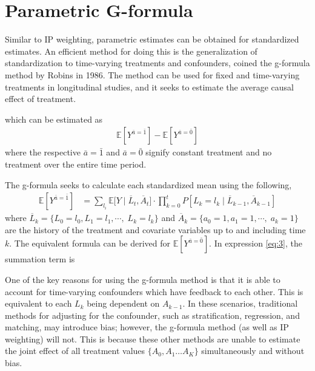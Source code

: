 \section{Parametric G-formula} 
Similar to IP weighting, parametric estimates can be obtained for standardized estimates.  An efficient method for doing this is the generalization of standardization to time-varying treatments and confounders, coined the g-formula method by Robins in 1986.\cite{robins1986new, wright2015international, hernan_robins_2016}  The method can be used for fixed and time-varying treatments in longitudinal studies, and it seeks to estimate the average causal effect of treatment.  

which can be estimated as 
\begin{align} 
\mathbb{E}[Y^{\bar{a} = \bar{1}}] - \mathbb{E}[Y^{\bar{a} = \bar{0}}] 
\end{align} 
where the respective $\bar{a} = \bar{1}$ and $\bar{a} = \bar{0}$ signify constant treatment and no treatment over the entire time period.  

The g-formula seeks to calculate each standardized mean using the following, 
\begin{align} \label{eq:3} 
\mathbb{E}[Y^{\bar{a}= \bar{1}}] &= \sum_{l_i} \mathbb{E} \big[Y \mid  \overline{L}_{t}, \overline{A}_{t} \big]\cdot \prod_{k=0}^t P[L_k = l_k \mid \overline{L}_{k-1}, \overline{A}_{k-1}]
\end{align}
where $\overline{L}_k = \{L_{0} = l_0, L_{1} = l_1,  \cdots, \; L_{k} = l_k\}$ and $\overline{A}_k = \{a_{0} = 1, a_{1} = 1,  \cdots, \; a_{k} = 1\}$ are the history of the treatment and covariate variables up to and including time $k$.  The equivalent formula can be derived for $ \mathbb{E}[Y^{\bar{a} = \bar{0}}]$.   In expression \ref{eq:3}, the summation term is %

One of the key reasons for using the g-formula method is that it is able to account for time-varying confounders which have feedback to each other.  This is equivalent to each $L_k$ being dependent on $A_{k-1}$.\cite{robins1986new}  In these scenarios, traditional methods for adjusting for the confounder, such as stratification, regression, and matching, may introduce bias; however, the g-formula method (as well as IP weighting) will not.\cite{wright2015international}  This is because these other methods are unable to estimate the joint effect of all treatment values $\{A_0, A_1 \dots A_K \}$ simultaneously and without bias.\cite{fitzmaurice2008longitudinal}  

